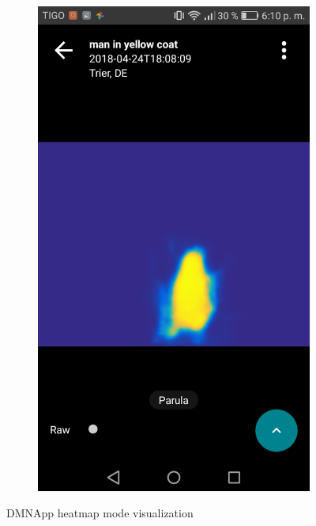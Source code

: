 \begin{figure}[!htbp]
\begin{multicols}{2}
    \begin{subfigure}[b]{\columnwidth}
            \centering
            \includegraphics[width=\textwidth]{./figures/dmn_app/views/9.png}
    \label{subfig:colormap}
    \end{subfigure}
    \end{multicols}
    
    \caption{DMNApp heatmap mode visualization}
    \label{Fig:Vis_Heat}
\end{figure}

